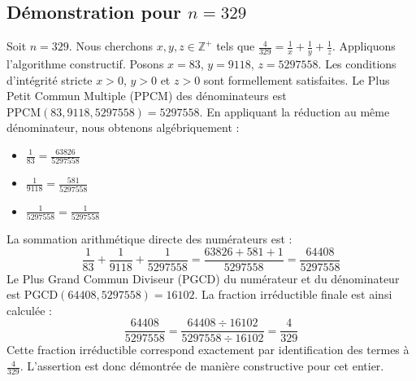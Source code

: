 \documentclass[11pt,a4paper]{article}
\begin{document}
\subsection{Démonstration pour $n = 329$}
Soit $n = 329$. Nous cherchons $x, y, z \in \mathbb{Z}^{+}$ tels que $\frac{4}{329} = \frac{1}{x} + \frac{1}{y} + \frac{1}{z}$.
Appliquons l'algorithme constructif. Posons $x = 83$, $y = 9118$, $z = 5297558$.
Les conditions d'intégrité stricte $x > 0$, $y > 0$ et $z > 0$ sont formellement satisfaites.
Le Plus Petit Commun Multiple (PPCM) des dénominateurs est $\text{PPCM}(83, 9118, 5297558) = 5297558$.
En appliquant la réduction au même dénominateur, nous obtenons algébriquement :
\begin{itemize}
    \item $\frac{1}{83} = \frac{63826}{5297558}$
    \item $\frac{1}{9118} = \frac{581}{5297558}$
    \item $\frac{1}{5297558} = \frac{1}{5297558}$
\end{itemize}
La sommation arithmétique directe des numérateurs est :
$$ \frac{1}{83} + \frac{1}{9118} + \frac{1}{5297558} = \frac{63826 + 581 + 1}{5297558} = \frac{64408}{5297558} $$
Le Plus Grand Commun Diviseur (PGCD) du numérateur et du dénominateur est $\text{PGCD}(64408, 5297558) = 16102$.
La fraction irréductible finale est ainsi calculée :
$$ \frac{64408}{5297558} = \frac{64408 \div 16102}{5297558 \div 16102} = \frac{4}{329} $$
Cette fraction irréductible correspond exactement par identification des termes à $\frac{4}{329}$. L'assertion est donc démontrée de manière constructive pour cet entier.
\end{document}
